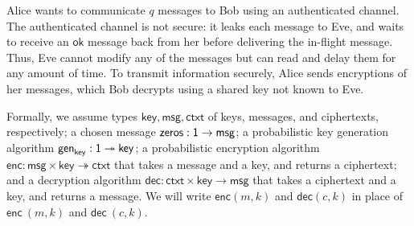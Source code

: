 \renewcommand{\key}{\mathsf{key}}
\renewcommand{\msg}{\mathsf{msg}}
\renewcommand{\ctxt}{\mathsf{ctxt}}
\renewcommand{\zeros}{\mathsf{zeros}}
\renewcommand{\gen}{\mathsf{gen}}
\renewcommand{\enc}{\mathsf{enc}}
\newcommand{\dec}{\mathsf{dec}}
\newcommand{\id}{\mathsf{id}}
\newcommand{\adv}{\mathsf{adv}}
\newcommand{\net}{\mathsf{net}}
\newcommand{\In}{\mathsf{In}}
\newcommand{\Out}{\mathsf{Out}}
\renewcommand{\Key}{\mathsf{Key}}
\newcommand{\Send}{\mathsf{Send}}
\newcommand{\Recv}{\mathsf{Recv}}
\renewcommand{\Enc}{\mathsf{Enc}}
\newcommand{\Dec}{\mathsf{Dec}}
\newcommand{\LeakMsgRcvd}{\mathsf{LeakMsgRcvd}}
\newcommand{\OkMsg}{\mathsf{OkMsg}}
\newcommand{\LeakCtxt}{\mathsf{LeakCtxt}}
\newcommand{\OkCtxt}{\mathsf{OkCtxt}}

Alice wants to communicate $q$ messages to Bob using an authenticated channel. The authenticated channel is not secure: it leaks each message to Eve, and waits to receive an $\mathsf{ok}$ message back from her before delivering the in-flight message. Thus, Eve cannot modify any of the messages but can read and delay them for any amount of time. To transmit information securely, Alice sends encryptions of her messages, which Bob decrypts using a shared key not known to Eve.

Formally, we assume types $\key, \msg, \ctxt$ of keys, messages, and ciphertexts, respectively; a chosen message $\zeros : \one \rightarrow \msg$; a probabilistic key generation algorithm $\gen_\key : \one \twoheadrightarrow \key$; a probabilistic encryption algorithm $\enc : \msg \times \key \twoheadrightarrow \ctxt$ that takes a message and a key, and returns a ciphertext; and a decryption algorithm $\dec : \ctxt \times \key \rightarrow \msg$
that takes a ciphertext and a key, and returns a message. We will write $\enc(m,k)$ and $\dec(c,k)$ in place of $\enc \ (m,k)$ and $\dec \ (c,k)$.

